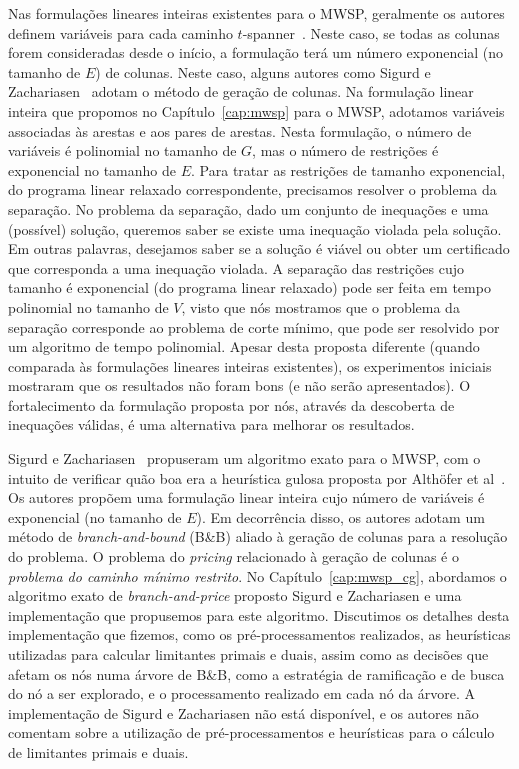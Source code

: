 Nas formulações lineares inteiras existentes para o MWSP, geralmente os autores definem variáveis para cada caminho $t$-spanner~\cite{SigurdZ2004,DinitzK2011}. Neste caso, se todas as colunas forem consideradas desde o início, a formulação terá um número exponencial (no tamanho de $E$) de colunas. Neste caso, alguns autores como Sigurd e Zachariasen~\cite{SigurdZ2004} adotam o método de geração de colunas. Na formulação linear inteira que propomos no Capítulo~\ref{cap:mwsp} para o MWSP, adotamos variáveis associadas às arestas e aos pares de arestas. Nesta formulação, o número de variáveis é polinomial no tamanho de $G$, mas o número de restrições é exponencial no tamanho de $E$.  Para tratar as restrições de tamanho exponencial, do programa linear relaxado correspondente, precisamos resolver o problema da separação. No problema da separação, dado um conjunto de inequações e uma (possível) solução, queremos saber se existe uma inequação violada pela solução.  Em outras palavras, desejamos saber se a solução é viável ou obter um certificado que corresponda a uma inequação violada.  A separação das restrições cujo tamanho é exponencial (do programa linear relaxado) pode ser feita em tempo polinomial no tamanho de $V$, visto que nós mostramos que o problema da separação corresponde ao problema de corte mínimo, que pode ser resolvido por um algoritmo de tempo polinomial.
Apesar desta proposta diferente (quando comparada às formulações
  lineares inteiras existentes), os experimentos iniciais mostraram que os
  resultados não foram bons (e não serão apresentados). O fortalecimento da
  formulação proposta por nós, através da descoberta
de inequações válidas, é uma alternativa para melhorar os resultados.

Sigurd e Zachariasen~\cite{SigurdZ2004} propuseram um algoritmo exato para o MWSP, com o intuito de verificar quão boa era a heurística gulosa proposta por Alth\"{o}fer et al~\cite{AlthoferDDJS1993}. Os autores propõem uma formulação linear inteira cujo número de variáveis é exponencial (no tamanho de $E$). Em decorrência disso, os autores adotam um método de \emph{branch-and-bound} (B\&B) aliado à geração de colunas para a resolução do problema. O problema do \emph{pricing} relacionado à geração de colunas é o \emph{problema do caminho mínimo restrito}. No Capítulo~\ref{cap:mwsp_cg}, abordamos o algoritmo exato de \emph{branch-and-price} proposto Sigurd e Zachariasen e uma implementação que propusemos para este algoritmo.
Discutimos os detalhes desta implementação que fizemos, como os pré-processamentos realizados, as heurísticas utilizadas para calcular limitantes primais e duais, assim como as decisões que afetam os nós numa árvore de B\&B, como a estratégia de ramificação e de busca do nó 
a ser explorado, e o processamento realizado em cada nó da árvore.
A implementação de Sigurd e Zachariasen não está disponível, e 
  os autores não comentam sobre a utilização de pré-processamentos e heurísticas
  para o cálculo de limitantes primais e duais.

